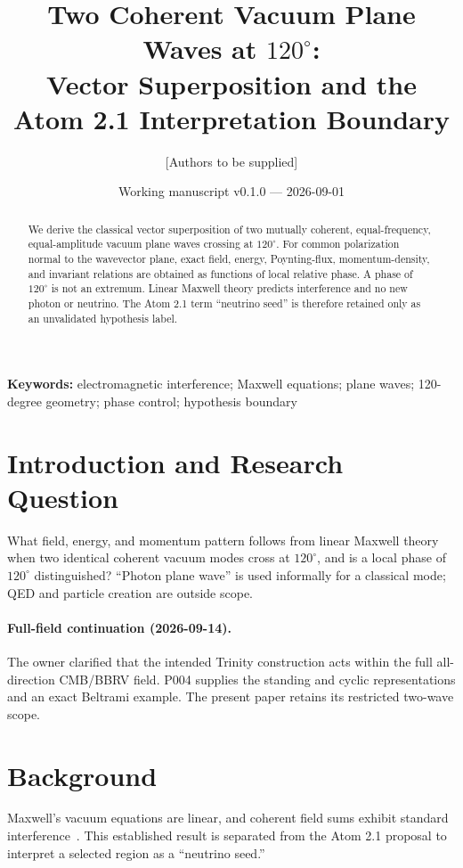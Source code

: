 \documentclass[11pt]{article}
\title{Two Coherent Vacuum Plane Waves at $120^\circ$:\\
Vector Superposition and the Atom 2.1 Interpretation Boundary}
\author{[Authors to be supplied]\\[Affiliations to be supplied]}
\date{Working manuscript v0.1.0 --- 2026-09-01}
\begin{document}
\maketitle

\begin{abstract}
We derive the classical vector superposition of two mutually coherent,
equal-frequency, equal-amplitude vacuum plane waves crossing at $120^\circ$.
For common polarization normal to the wavevector plane, exact field, energy,
Poynting-flux, momentum-density, and invariant relations are obtained as functions
of local relative phase. A phase of $120^\circ$ is not an extremum. Linear Maxwell
theory predicts interference and no new photon or neutrino. The Atom 2.1 term
``neutrino seed'' is therefore retained only as an unvalidated hypothesis label.
\end{abstract}

\noindent\textbf{Keywords:} electromagnetic interference; Maxwell equations;
plane waves; 120-degree geometry; phase control; hypothesis boundary

\section{Introduction and Research Question}
What field, energy, and momentum pattern follows from linear Maxwell theory when
two identical coherent vacuum modes cross at $120^\circ$, and is a local phase of
$120^\circ$ distinguished? ``Photon plane wave'' is used informally for a classical
mode; QED and particle creation are outside scope.

\paragraph{Full-field continuation (2026-09-14).}
The owner clarified that the intended Trinity construction acts within the full
all-direction CMB/BBRV field. P004 supplies the standing and cyclic representations
and an exact Beltrami example. The present paper retains its restricted two-wave scope.

\section{Background}
Maxwell's vacuum equations are linear, and coherent field sums exhibit standard
interference~\cite{jackson1999,bornwolf1999,mandelwolf1995}. This established result
is separated from the Atom 2.1 proposal to interpret a selected region as a
``neutrino seed.''
\end{document}
